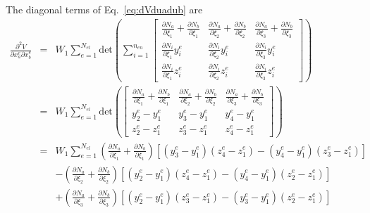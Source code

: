 \documentclass[12pt,aps,pre]{revtex4}
\begin{document}
The diagonal terms of Eq.\ \eqref{eq:dVduadub} are
%
\begin{eqnarray}
\frac{\partial^2 V}{\partial x_a^e \partial x_b^e} &=& W_1\sum_{e=1}^{N_{el}} \text{det}\left(\sum_{i=1}^{n_{en}}
%
\begin{bmatrix}
\frac{\partial N_a}{\partial \xi_1}+\frac{\partial N_b}{\partial \xi_1}  & \frac{\partial N_a}{\partial \xi_2}+\frac{\partial N_b}{\partial \xi_2} & \frac{\partial N_a}{\partial \xi_3}+\frac{\partial N_b}{\partial \xi_3} \\
%
\frac{\partial N_i}{\partial \xi_1}y_i^e   & \frac{\partial N_i}{\partial \xi_2}y_i^e & \frac{\partial N_i}{\partial \xi_3}y_i^e \\
%
\frac{\partial N_i}{\partial \xi_1}z_i^e  & \frac{\partial N_i}{\partial \xi_2}z_i^e & \frac{\partial N_i}{\partial \xi_3}z_i^e 
\end{bmatrix}\right) \nonumber\\
&=&W_1 \sum_{e=1}^{N_{el}} \text{det}\left(
%
\begin{bmatrix}
\frac{\partial N_a}{\partial \xi_1}+\frac{\partial N_b}{\partial \xi_1}  & \frac{\partial N_a}{\partial \xi_2}+\frac{\partial N_b}{\partial \xi_2} & \frac{\partial N_a}{\partial \xi_3}+\frac{\partial N_b}{\partial \xi_3} \\
%
y_2^e - y_1^e & y_3^e - y_1^e & y_4^e - y_1^e \\
%
z_2^e - z_1^e & z_3^e - z_1^e & z_4^e - z_1^e 
\end{bmatrix}\right) \nonumber\\
&=& W_1\sum_{e=1}^{N_{el}}\left(\frac{\partial N_a}{\partial \xi_1}+\frac{\partial N_b}{\partial \xi_1}\right)[(y_3^e - y_1^e)(z_4^e - z_1^e)-(y_4^e - y_1^e)(z_3^e - z_1^e)] \nonumber\\
%
&&-\left(\frac{\partial N_a}{\partial \xi_2}+\frac{\partial N_b}{\partial \xi_2}\right)\left[(y_2^e - y_1^e)(z_4^e - z_1^e)-(y_4^e - y_1^e)(z_2^e - z_1^e)\right] \nonumber\\
%
&&+\left(\frac{\partial N_a}{\partial \xi_3}+\frac{\partial N_b}{\partial \xi_3}\right)\left[(y_2^e - y_1^e)(z_3^e - z_1^e)-(y_3^e - y_1^e)(z_2^e - z_1^e)\right]
\end{eqnarray}
\end{document}
